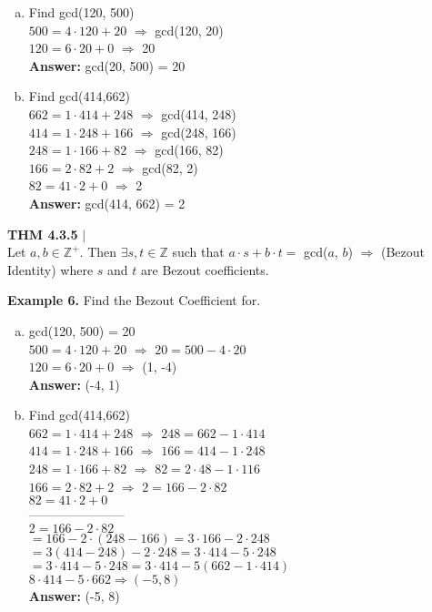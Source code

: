\documentclass [12pt]{article}
\begin{document}
\begin{enumerate}[a)]
    \item Find gcd(120, 500)\\
    $500 = 4\cdot 120 + 20$ $\Rightarrow$ gcd(120, 20)\\
    $120 = 6\cdot 20 + 0$ $\Rightarrow$ 20\\
    \textbf{Answer: }gcd(20, 500) = 20
    \item Find gcd(414,662)\\
    $662 = 1\cdot 414 + 248$ $\Rightarrow$ gcd(414, 248)\\
    $414 = 1\cdot 248 + 166$ $\Rightarrow$ gcd(248, 166)\\
    $248 = 1\cdot 166 + 82$ $\Rightarrow$ gcd(166, 82)\\
    $166 = 2\cdot 82 + 2$ $\Rightarrow$ gcd(82, 2)\\
    $82 = 41\cdot 2 + 0$ $\Rightarrow$ 2\\
    \textbf{Answer: }gcd(414, 662) = 2
\end{enumerate}
\vspace{0.2in}

\begin{framed}
\noindent\textbf{THM 4.3.5} $|$ \\
Let $a,b\in\mathbb{Z^+}$. Then $\exists s,t\in\mathbb{Z}$ such that $a\cdot s + b\cdot t = $ gcd($a$, $b$) $\Rightarrow$ (Bezout Identity) where $s$ and $t$ are Bezout coefficients.
\end{framed}
\noindent\textbf{Example 6. }Find the Bezout Coefficient for.
\begin{enumerate}[a)]
    \item gcd(120, 500) = 20\\
    $500 = 4\cdot 120 + 20$ $\Rightarrow$ $20 = 500 - 4\cdot20$\\
    $120 = 6\cdot 20 + 0$ $\Rightarrow$ (1, -4)\\
    \textbf{Answer: }(-4, 1)
    \item Find gcd(414,662)\\
    $662 = 1\cdot 414 + 248$ $\Rightarrow$ $248 = 662-1\cdot414$\\
    $414 = 1\cdot 248 + 166$ $\Rightarrow$ $166=414-1\cdot248$\\
    $248 = 1\cdot 166 + 82$ $\Rightarrow$ $82=2\cdot48-1\cdot116$\\
    $166 = 2\cdot 82 + 2$ $\Rightarrow$ $2=166-2\cdot82$\\
    $82 = 41\cdot 2 + 0$\\
    -----------------------\\
    $2 = 166-2\cdot82$\\
    $=166-2\cdot(248-166) = 3\cdot166-2\cdot248$\\
    $=3(414-248)-2\cdot248 = 3\cdot414-5\cdot248$\\
    $=3\cdot414-5\cdot248 = 3\cdot414 - 5(662-1\cdot414)$\\
    $8\cdot414 - 5\cdot662 \Rightarrow (-5,8)$\\
    \textbf{Answer: } (-5, 8)
\end{enumerate}
\vspace{0.2in}
\end{document}
